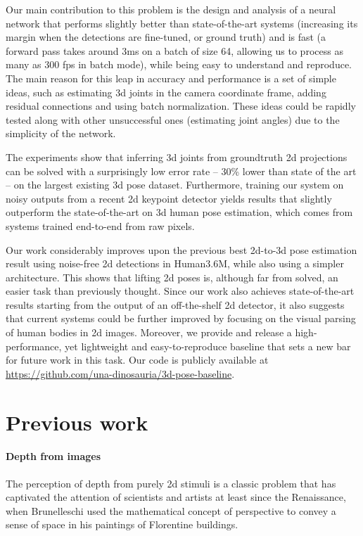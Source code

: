 \documentclass[10pt,twocolumn,letterpaper]{article}
\begin{document}
Our main contribution to this problem is the design and analysis of a neural network that performs slightly better than state-of-the-art systems (increasing its margin when the detections are fine-tuned, or ground truth) and is fast (a forward pass takes around $3$ms on a batch of size 64, allowing us to process as many as $300$ fps in batch mode), while being easy to understand and reproduce. The main reason for this leap in accuracy and performance is a set of simple ideas, such as estimating 3d joints in the camera coordinate frame, adding residual connections and using batch normalization. These ideas could be rapidly tested along with other unsuccessful ones (\eg estimating joint angles) due to the simplicity of the network.

The experiments show that inferring 3d joints from groundtruth 2d projections can be solved with a surprisingly low error rate -- 30\% lower than state of the art -- on the largest existing 3d pose dataset.
Furthermore, training our system on noisy outputs from a recent 2d keypoint detector yields results that 
slightly outperform
the state-of-the-art on 3d human pose estimation, which comes from systems trained end-to-end from raw pixels.

Our work considerably improves upon the previous best 2d-to-3d pose estimation result using noise-free 2d detections in Human3.6M, while also using a simpler architecture. This shows that lifting 2d poses is, although far from solved, an easier task than previously thought.
Since our work also achieves 
state-of-the-art results
starting from the output of an off-the-shelf 2d detector, it also suggests that current systems could be further improved by focusing on the visual parsing of human bodies in 2d images.
Moreover, we provide and release a high-performance, yet lightweight and easy-to-reproduce
baseline that sets a new bar for future work in this task.
Our code is publicly available at \url{https://github.com/una-dinosauria/3d-pose-baseline}.

\section{Previous work}

\paragraph{Depth from images}
The perception of depth from purely 2d stimuli is a classic problem that has captivated the attention of scientists and artists at least since the Renaissance, when Brunelleschi used the mathematical concept of perspective to convey a sense of space in his paintings of Florentine buildings.
\end{document}
